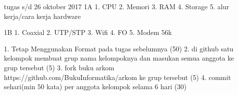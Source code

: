 tugas s/d 26 oktober 2017
1A
1. CPU
2. Memori
3. RAM
4. Storage
5. alur kerja/cara kerja hardware


1B 
1. Coaxial
2. UTP/STP
3. Wifi
4. FO
5. Modem 56k

1. Tetap Menggunakan Format pada tugas sebelumnya (50)
2. di github satu kelompok membuat grup nama kelompoknya dan masukan semua anggota ke grup tersebut (5)
3. fork buku arkom https://github.com/BukuInformatika/arkom ke grup tersebut (5)
4. commit sehari(min 50 kata) per anggota kelompok selama 6 hari (30)